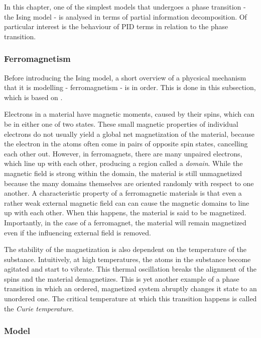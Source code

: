 \documentclass[12pt]{article}
\begin{document}
In this chapter, one of the simplest models that undergoes a phase transition - the Ising model - is analysed in terms of partial information decomposition. Of particular interest is the behaviour of PID terms in relation to the phase transition.

\subsubsection{Ferromagnetism}

Before introducing the Ising model, a short overview of a phycsical mechanism that it is modelling - ferromagnetism - is in order. This is done in this subsection, which is based on \cite{memory-systems-cache-ram}.

Electrons in a material have magnetic moments, caused by their spins, which can be in either one of two states. These small magnetic properties of individual electrons do not usually yield a global net magnetization of the material, because the electron in the atoms often come in pairs of opposite spin states, cancelling each other out. However, in ferromagnets, there are many unpaired electrons, which line up with each other, producing a region called a \textit{domain}. While the magnetic field is strong within the domain, the material is still unmagnetized because the many domains themselves are oriented randomly with respect to one another. A characteristic property of a ferromagnetic materials is that even a rather weak external magnetic field can can cause the magnetic domains to line up with each other. When this happens, the material is said to be magnetized. Importantly, in the case of a ferromagnet, the material will remain magnetized even if the influencing external field is removed. 

The stability of the magnetization is also dependent on the temperature of the substance. Intuitively, at high temperatures, the atoms in the substance become agitated and start to vibrate. This thermal oscillation breaks the alignment of the spins and the material demagnetizes. This is yet another example of a phase transition in which an ordered, magnetized system abruptly changes it state to an unordered one. The critical temperature at which this transition happens is called the \textit{Curie temperature}.


\subsubsection{Model} 
\end{document}

